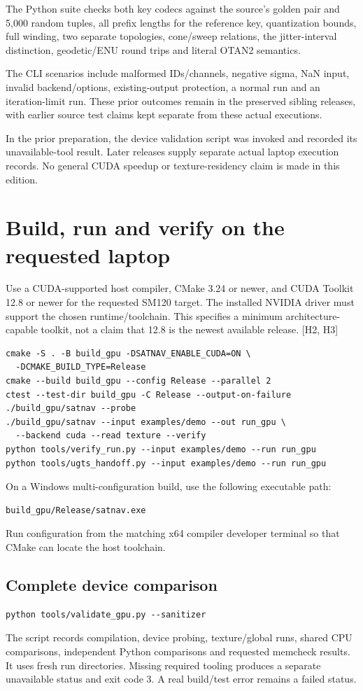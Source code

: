 \documentclass[11pt,a4paper]{article}
\newcommand{\ext}[1]{\textcolor{muted}{[#1]}}
\begin{document}
The Python suite checks both key codecs against the source's golden pair and 5,000
random tuples, all prefix lengths for the reference key, quantization bounds, full
winding, two separate topologies, cone/sweep relations, the jitter-interval distinction,
geodetic/ENU round trips and literal OTAN2 semantics.

The CLI scenarios include malformed IDs/channels, negative sigma, NaN input, invalid
backend/options, existing-output protection, a normal run and an iteration-limit run.
These prior outcomes remain in the preserved sibling releases, with earlier source test claims
kept separate from these actual executions.

In the prior preparation, the device validation script was invoked and recorded
its unavailable-tool result. Later releases supply separate actual laptop execution records. No general CUDA speedup or texture-residency claim is made
in this edition.
\clearpage

\section{Build, run and verify on the requested laptop}
Use a CUDA-supported host compiler, CMake 3.24 or newer, and CUDA Toolkit 12.8 or newer
for the requested SM120 target. The installed NVIDIA driver must support the chosen
runtime/toolchain. This specifies a minimum architecture-capable toolkit, not a claim
that 12.8 is the newest available release. \ext{H2, H3}

\begin{lstlisting}
cmake -S . -B build_gpu -DSATNAV_ENABLE_CUDA=ON \
  -DCMAKE_BUILD_TYPE=Release
cmake --build build_gpu --config Release --parallel 2
ctest --test-dir build_gpu -C Release --output-on-failure
./build_gpu/satnav --probe
./build_gpu/satnav --input examples/demo --out run_gpu \
  --backend cuda --read texture --verify
python tools/verify_run.py --input examples/demo --run run_gpu
python tools/ugts_handoff.py --input examples/demo --run run_gpu
\end{lstlisting}
On a Windows multi-configuration build, use the following executable path:
\begin{lstlisting}
build_gpu/Release/satnav.exe
\end{lstlisting}
Run configuration from the matching x64 compiler developer terminal so that CMake can locate the host toolchain.

\subsection{Complete device comparison}
\begin{lstlisting}
python tools/validate_gpu.py --sanitizer
\end{lstlisting}
The script records compilation, device probing, texture/global runs, shared CPU
comparisons, independent Python comparisons and requested memcheck results. It
uses fresh run directories. Missing required tooling produces a separate unavailable
status and exit code 3. A real build/test error remains a failed status.
\end{document}
